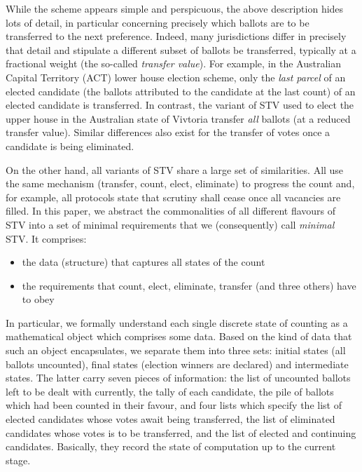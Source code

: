\documentclass{llncs}
\begin{document}
\noindent
While the scheme appears simple and perspicuous, the above
description hides lots of detail, in particular concerning precisely
which ballots are to be transferred to the next preference.
Indeed, many jurisdictions differ in precisely that detail and
stipulate a different subset of ballots be transferred, typically at
a fractional weight (the so-called \emph{transfer value}). 
For example, in the Australian Capital Territory (ACT) lower house
election scheme, only the 
\emph{last parcel} of an elected candidate (the ballots attributed
to the candidate at the last
count)  of an elected candidate is transferred. In
contrast, the variant of STV used to elect the upper house in the
Australian state of Vivtoria transfer \emph{all} ballots (at a
reduced transfer value). Similar differences also exist for the
transfer of votes once a candidate is being eliminated. 

On the other hand, all variants of STV share a large set of
similarities. All use the same mechanism (transfer, count, elect,
eliminate) to progress the count
and, 
for example, all protocols state that scrutiny shall cease once all
vacancies are filled. 
%
In this paper, we abstract the commonalities of all different
flavours of STV into a set of minimal requirements that we
(consequently) call 
\emph{minimal} STV. It comprises:
\begin{itemize}
\item the data (structure) that captures all states of the count
\item the requirements that count, elect, eliminate, transfer (and
three others) have to obey
\end{itemize}
\noindent
In particular, we formally understand each single
discrete state of counting as a mathematical object
which comprises some data. Based on the kind of data that such an
object encapsulates, we separate them into three sets: initial
states (all ballots uncounted), final states
(election winners are declared) and intermediate states. The latter
carry
seven pieces of information: the list of uncounted ballots left to
be dealt with currently, the tally of each candidate, the
pile of ballots which had been counted in their favour, and four
lists which specify the list of elected candidates whose votes await
being transferred, the list of eliminated candidates whose votes is
to be transferred, and the list of elected and continuing
candidates. Basically, they record the state of computation up to the
current stage. 
\end{document}

